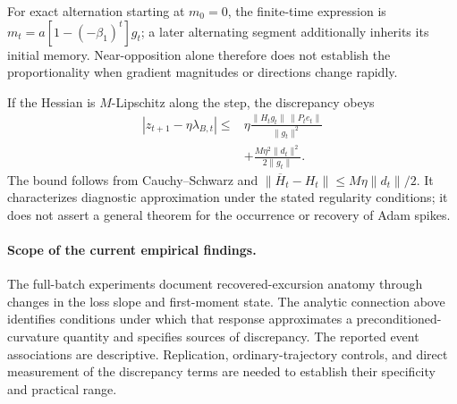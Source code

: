 For exact alternation starting at $m_0=0$, the finite-time expression is
$m_t=a[1-(-\beta_1)^t]g_t$; a later alternating segment additionally
inherits its initial memory. Near-opposition alone therefore does not
establish the proportionality when gradient magnitudes or directions
change rapidly.

If the Hessian is $M$-Lipschitz along the step, the discrepancy obeys
\begin{equation}
\begin{aligned}
|z_{t+1}-\eta\lambda_{B,t}|
\leq{}&
\eta\frac{\|H_tg_t\|\,\|P_te_t\|}{\|g_t\|^2}\\
&+\frac{M\eta^2\|d_t\|^2}{2\|g_t\|}.
\end{aligned}
\label{eq:adam-response-error-bound}
\end{equation}
The bound follows from Cauchy--Schwarz and
$\|\overline H_t-H_t\|\leq M\eta\|d_t\|/2$.
It characterizes diagnostic approximation under the stated regularity
conditions; it does not assert a general theorem for the occurrence
or recovery of Adam spikes.
%

\paragraph{Scope of the current empirical findings.}
The full-batch experiments document recovered-excursion anatomy through
changes in the loss slope and first-moment state. The analytic connection
above identifies conditions under which that response approximates a
preconditioned-curvature quantity and specifies sources of discrepancy.
The reported event associations are descriptive. Replication,
ordinary-trajectory controls, and direct measurement of the discrepancy
terms are needed to establish their specificity and practical range.

